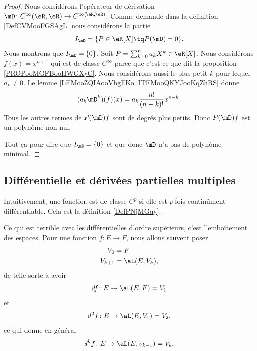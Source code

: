 \begin{proof}
	Nous considérons l'opérateur de dérivation \(\mD \colon C^{\infty}(\eR,\eR)\to C^{\infty(\eR,\eR)}  \). Comme demandé dans la définition \ref{DefCVMooFGSAgL} nous considérons la partie
	\begin{equation}
		I_{\mD}=\{ P\in \eR[X]\tq P(\mD)=0 \}.
	\end{equation}
	Nous montrons que \( I_{\mD}=\{ 0 \}\). Soit \( P=\sum_{k=0}^{n}a_kX^k\in \eR[X]\). Nous considérons \( f(x)=x^{n+1}\) qui est de classe \( C^{\infty}\) parce que c'est ce que dit la proposition \ref{PROPooMGFBooHWGXyC}. Nous considérons aussi le plus petit \( k\) pour lequel \( a_k\neq 0\). Le lemme \ref{LEMooZQIAooVbgFKo}\ref{ITEMooQKYJooKqZhRS} donne
	\begin{equation}
		(a_k\mD^k)(f)(x)=a_k\frac{ n! }{ (n-k)! }x^{n-k}.
	\end{equation}
	Tous les autres termes de \( P(\mD)f\) sont de degrés plus petits. Donc \( P(\mD)f\) est un polynôme non nul.

	Tout ça pour dire que \( I_{\mD}=\{ 0 \}\) et que donc \( \mD\) n'a pas de polynôme minimal.
\end{proof}




\subsection{Différentielle et dérivées partielles multiples}

Intuitivement, une fonction est de classe \( C^p\) si elle est \( p\) fois continûment différentiable. Cela est la définition \ref{DefPNjMGqy}.


Ce qui est terrible avec les différentielles d'ordre supérieurs, c'est l'emboîtement des espaces. Pour une fonction \( f\colon E\to F\), nous allons souvent poser
\begin{subequations}
	\begin{align}
		V_0     & =F           \\
		V_{k+1} & =\aL(E,V_k),
	\end{align}
\end{subequations}
de telle sorte à avoir
\begin{equation}
	df\colon E\to \aL(E,F)=V_1
\end{equation}
et
\begin{equation}
	d^2f\colon E\to \aL(E,V_1)=V_2,
\end{equation}
ce qui donne en général
\begin{equation}
	d^kf\colon E\to \aL(E,v_{k-1})=V_k.
\end{equation}

